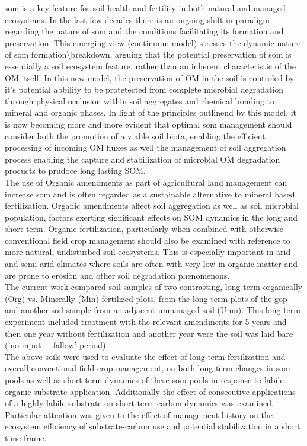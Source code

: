 \gls{som} is a key feature for soil health and fertility in both natural and
managed ecosystems. In the last few decades there is an ongoing shift in
paradigm regarding the nature of \gls{som} and the conditions facilitating its
formation and preservation. This emerging view (continuum model) stresses the
dynamic nature of \gls{som} formation\textbackslash breakdown, arguing that the
potential preservation of \gls{som} is essentially a soil ecosystem feature,
rather than an inherent characteristic of the OM itself. In this new model, the
preservation of OM in the soil is controled by it's potential abbility to be protetected
from complete microbial degradation through physical occlusion within soil
aggregates and chemical bonding to mineral and organic phases.  In light of the
principles outlinend by this model, it is now becoming more and more evident
that optimal \gls{som} management should consider both the promotion of a viable soil
biota, enabling the efficient processing of incoming OM fluxes as well the
management of soil aggregation process enabling the capture and stabilization of
microbial OM degradation procucts to prudoce long lasting SOM.  \\
The use of Organic amendments as part of agricultural land management can
increase \gls{som} and is often regarded as a sustainable alternative to
mineral based fertilization. Organic amendments affect soil aggregation as
well as soil microbial population, factors exerting significant effects on SOM dynamics in
the long and short term.  Organic fertilization, particularly when combined with otherwise conventional field crop management should also be examined with reference to more natural, undisturbed soil ecosystems. This is especially important in arid and semi arid climates where soils are often with very low in organic matter and are prone to erosion and other soil degradation phenomenons.\\
The current work compared soil samples of two contrasting, long term organically (Org) vs. Minerally (Min) fertilized plots, from the long term plots of the \gls{gop} and another soil sample from an adjacent unmanaged soil (Unm). This long-term experiment included treatment with the relevant amendments for 5 years and then one year without fertilization and another year were the soil was laid bare ('no input + fallow' period).\\
The above soils were used to evaluate the effect of long-term fertilization and overall conventional field crop management, on both long-term changes in \gls{som} pools as well as short-term dynamics of these \gls{som} pools in response to labile organic substrate application. Additionally the effect of consecutive applications of a highly labile substrate on short-term carbon dynamics was examined. Particular attention was given to the effect of management history on the ecosystem efficiency of substrate-carbon use and potential stabilization in a short time frame.\\
